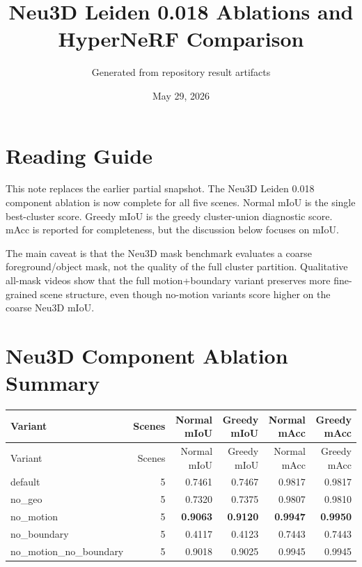 \documentclass[10pt]{article}
\begin{document}
\title{Neu3D Leiden 0.018 Ablations and HyperNeRF Comparison}
\author{Generated from repository result artifacts}
\date{May 29, 2026}
\maketitle

\section{Reading Guide}
This note replaces the earlier partial snapshot.  The Neu3D Leiden 0.018 component ablation is now complete for all five scenes.  Normal mIoU is the single best-cluster score.  Greedy mIoU is the greedy cluster-union diagnostic score.  mAcc is reported for completeness, but the discussion below focuses on mIoU.

The main caveat is that the Neu3D mask benchmark evaluates a coarse foreground/object mask, not the quality of the full cluster partition.  Qualitative all-mask videos show that the full motion+boundary variant preserves more fine-grained scene structure, even though no-motion variants score higher on the coarse Neu3D mIoU.

\section{Neu3D Component Ablation Summary}
\small
\begin{longtable}{lrrrrr}
\toprule
Variant & Scenes & Normal mIoU & Greedy mIoU & Normal mAcc & Greedy mAcc \\
\midrule
\endfirsthead
\toprule
Variant & Scenes & Normal mIoU & Greedy mIoU & Normal mAcc & Greedy mAcc \\
\midrule
\endhead
default & 5 & 0.7461 & 0.7467 & 0.9817 & 0.9817 \\
no\_geo & 5 & 0.7320 & 0.7375 & 0.9807 & 0.9810 \\
no\_motion & 5 & \textbf{0.9063} & \textbf{0.9120} & \textbf{0.9947} & \textbf{0.9950} \\
no\_boundary & 5 & 0.4117 & 0.4123 & 0.7443 & 0.7443 \\
no\_motion\_no\_boundary & 5 & 0.9018 & 0.9025 & 0.9945 & 0.9945 \\
\bottomrule
\end{longtable}
\normalsize
\end{document}
